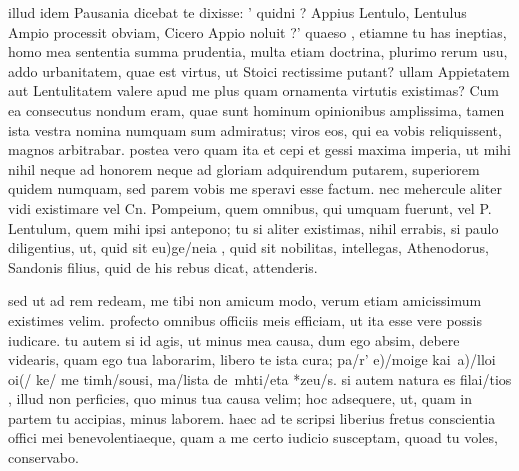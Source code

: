  illud idem Pausania dicebat te dixisse: ' quidni ? Appius Lentulo, Lentulus Ampio processit obviam, Cicero Appio noluit ?' quaeso , etiamne tu has ineptias, homo mea sententia summa prudentia, multa etiam doctrina, plurimo rerum usu, addo urbanitatem, quae est virtus, ut Stoici rectissime putant? ullam Appietatem aut Lentulitatem valere apud me plus quam ornamenta virtutis existimas? Cum ea consecutus nondum eram, quae sunt hominum opinionibus amplissima, tamen ista vestra nomina numquam sum admiratus; viros eos, qui ea vobis reliquissent, magnos arbitrabar. postea vero quam ita et cepi et gessi maxima imperia, ut mihi nihil neque ad honorem neque ad gloriam adquirendum putarem, superiorem quidem numquam, sed parem vobis me speravi esse factum. nec mehercule aliter vidi existimare vel Cn. Pompeium, quem omnibus, qui umquam fuerunt, vel P. Lentulum, quem mihi ipsi antepono; tu si aliter existimas, nihil errabis, si paulo diligentius, ut, quid sit eu)ge/neia , quid sit nobilitas, intellegas, Athenodorus, Sandonis filius, quid de his rebus dicat, attenderis.

 sed ut ad rem redeam, me tibi non amicum modo, verum etiam amicissimum existimes velim. profecto omnibus officiis meis efficiam, ut ita esse vere possis iudicare. tu autem si id agis, ut minus mea causa, dum ego absim, debere videaris, quam ego tua laborarim, libero te ista cura; pa/r' e)/moige kai\ a)/lloi oi(/ ke/ me timh/sousi, ma/lista de\ mhti/eta *zeu/s. si autem natura es filai/tios , illud non perficies, quo minus tua causa velim; hoc adsequere, ut, quam in partem tu accipias, minus laborem. haec ad te scripsi liberius fretus conscientia offici mei benevolentiaeque, quam a me certo iudicio susceptam, quoad tu voles, conservabo.
